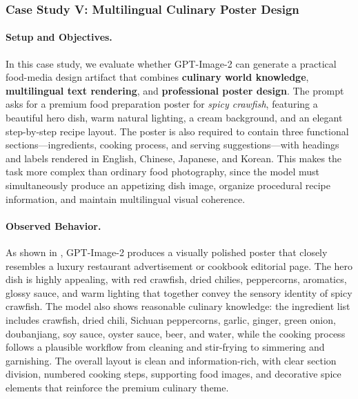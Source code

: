 \documentclass{llmxive}
\begin{document}
\subsubsection{Case Study V: Multilingual Culinary Poster Design}

\paragraph{Setup and Objectives.}
In this case study, we evaluate whether GPT-Image-2 can generate a practical food-media design artifact that combines \textbf{culinary world knowledge}, \textbf{multilingual text rendering}, and \textbf{professional poster design}. The prompt asks for a premium food preparation poster for \emph{spicy crawfish}, featuring a beautiful hero dish, warm natural lighting, a cream background, and an elegant step-by-step recipe layout. The poster is also required to contain three functional sections---ingredients, cooking process, and serving suggestions---with headings and labels rendered in English, Chinese, Japanese, and Korean. This makes the task more complex than ordinary food photography, since the model must simultaneously produce an appetizing dish image, organize procedural recipe information, and maintain multilingual visual coherence.

\paragraph{Observed Behavior.}
As shown in , GPT-Image-2 produces a visually polished poster that closely resembles a luxury restaurant advertisement or cookbook editorial page. The hero dish is highly appealing, with red crawfish, dried chilies, peppercorns, aromatics, glossy sauce, and warm lighting that together convey the sensory identity of spicy crawfish. The model also shows reasonable culinary knowledge: the ingredient list includes crawfish, dried chili, Sichuan peppercorns, garlic, ginger, green onion, doubanjiang, soy sauce, oyster sauce, beer, and water, while the cooking process follows a plausible workflow from cleaning and stir-frying to simmering and garnishing. The overall layout is clean and information-rich, with clear section division, numbered cooking steps, supporting food images, and decorative spice elements that reinforce the premium culinary theme.
\end{document}
